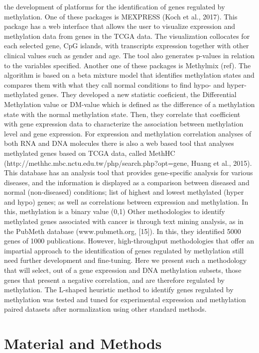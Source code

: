 \documentclass[10pt,letterpaper]{article}
\begin{document}
the development of platforms for the identification of genes regulated
by methylation. One of these packages is MEXPRESS (Koch et al., 2017).
This package has a web interface that allows the user to visualize
expression and methylation data from genes in the TCGA data. The
visualization collocates for each selected gene, CpG islands, with
transcripts expression together with other clinical values such as
gender and age. The tool also generates p-values in relation to the
variables specified. Another one of these packages is Methylmix (ref).
The algorithm is based on a beta mixture model that identifies
methylation states and compares them with what they call normal
conditions to find hypo- and hyper-methylated genes. They developed a
new statistic coeficient, the Differential Methylation value or DM-value
which is defined as the difference of a methylation state with the
normal methylation state. Then, they correlate that coefficient with
gene expression data to characterize the association between methylation
level and gene expression. For expression and methylation correlation
analyses of both RNA and DNA molecules there is also a web based tool
that analyses methylated genes based on TCGA data, called MethHC
(http://methhc.mbc.nctu.edu.tw/php/search.php?opt=gene, Huang et al.,
2015). This database has an analysis tool that provides gene-specific
analysis for various diseases, and the information is displayed as a
comparison between diseased and normal (non-diseased) conditions; list
of highest and lowest methylated (hyper and hypo) genes; as well as
correlations between expression and methylation. In this, methylation is
a binary value (0,1) Other methodologies to identify methylated genes
associated with cancer is through text mining analysis, as in the
PubMeth database (www.pubmeth.org, {[}15{]}). In this, they identified
5000 genes of 1000 publications. However, high-throughput methodologies
that offer an impartial approach to the identification of genes
regulated by methylation still need further development and fine-tuning.
Here we present such a methodology that will select, out of a gene
expression and DNA methylation subsets, those genes that present a
negative correlation, and are therefore regulated by methylation. The
L-shaped heuristic method to identify genes regulated by methylation was
tested and tuned for experimental expression and methylation paired
datasets after normalization using other standard methods.

\hypertarget{material-and-methods}{%
\section{Material and Methods}\label{material-and-methods}}
\end{document}

